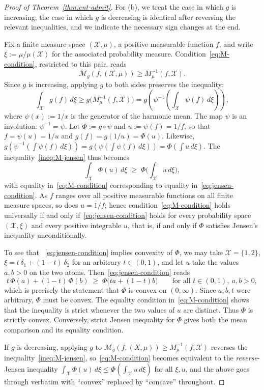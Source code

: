 \documentclass[reqno]{amsart}
\begin{document}
\begin{proof}[Proof of Theorem~\ref{thm:ent-admit}]
For (b), we treat the case in which $g$ is increasing; the case in which $g$ is
decreasing is identical after reversing the relevant inequalities, and we
indicate the necessary sign changes at the end.

Fix a finite measure space $(\mathcal{X},\mu)$, a positive measurable function
$f$, and write $\xi := \mu/\mu(\mathcal{X})$ for the associated probability
measure. Condition~\eqref{eq:M-condition}, restricted to this pair, reads
$$
  \mathcal{M}_g(f,(\mathcal{X},\mu)) \geq M^{-1}_\mu(f,\mathcal{X}).
$$
Since $g$ is increasing, applying $g$ to both sides preserves the
inequality:
\begin{equation}
\label{ineq:M-jensen}
  \int_\mathcal{X} g(f)\,d\xi \geq g\Big(M^{-1}_\mu(f,\mathcal{X})\Big)
  = g\left(\psi^{-1}\left(\int_\mathcal{X} \psi(f)\,d\xi\right)\right),
\end{equation}
where $\psi(x):=1/x$ is the generator of the harmonic mean. The map $\psi$
is an involution: $\psi^{-1}=\psi$. Let $\Phi:= g \circ \psi$ and $u := \psi(f) = 1/f$, so
that $f = \psi(u) = 1/u$ and $g(f) = g(1/u) = \Phi(u)$. Likewise,
$g(\psi^{-1}(\int \psi(f)\,d\xi)) = g(\psi(\int \psi(f)\,d\xi)) = \Phi(\int u\,d\xi)$. The inequality~\eqref{ineq:M-jensen} thus becomes
\begin{equation}
\label{eq:jensen-condition}
  \int_\mathcal{X} \Phi(u)\,d\xi \;\ge\; \Phi\Big(\int_\mathcal{X} u\,d\xi\Big),
\end{equation}
with equality in~\eqref{eq:M-condition} corresponding to equality in~\eqref{eq:jensen-condition}. As $f$
ranges over all positive measurable functions on all finite measure
spaces, so does $u=1/f$; hence condition~\eqref{eq:M-condition} holds universally if and
only if~\eqref{eq:jensen-condition} holds for every probability space $(\mathcal{X},\xi)$ and every
positive integrable $u$, that is, if and only if $\Phi$ satisfies Jensen's inequality unconditionally.

To see that ~\eqref{eq:jensen-condition} implies convexity of $\Phi$, we may take  $\mathcal{X}=\{1,2\}$,
$\xi = t\,\delta_1 + (1-t)\,\delta_2$ for an arbitrary $t\in(0,1)$, and let
$u$ take the values $a,b>0$ on the two atoms. Then~\eqref{eq:jensen-condition} reads
$$
  t\,\Phi(a) + (1-t)\,\Phi(b) \;\ge\; \Phi\big(ta+(1-t)b\big)
  \qquad \text{for all } t\in(0,1),\ a,b>0,
$$
which is precisely the statement that $\Phi$ is convex on $(0,\infty)$.
Since $a,b,t$ were arbitrary, $\Phi$ must be convex. 
The equality condition in~\eqref{eq:M-condition} shows that the inequality is strict
whenever the two values of $u$ are distinct. Thus $\Phi$ is strictly
convex. Conversely, strict Jensen inequality for $\Phi$ gives both the
mean comparison and its equality condition. 

If $g$ is decreasing, applying $g$ to $\mathcal{M}_g(f,(X,\mu))\ge M^{-1}_\mu(f,\mathcal{X})$
reverses the inequality~\eqref{ineq:M-jensen}, so~\eqref{eq:M-condition} becomes equivalent to the
\emph{reverse}-Jensen inequality $\int_{\mathcal{X}} \Phi(u)\,d\xi \leq
\Phi(\int_{\mathcal{X}} u\,d\xi)$ for all $\xi,u$, and the above
goes through verbatim with ``convex'' replaced by ``concave'' throughout.
\end{proof}
\end{document}
